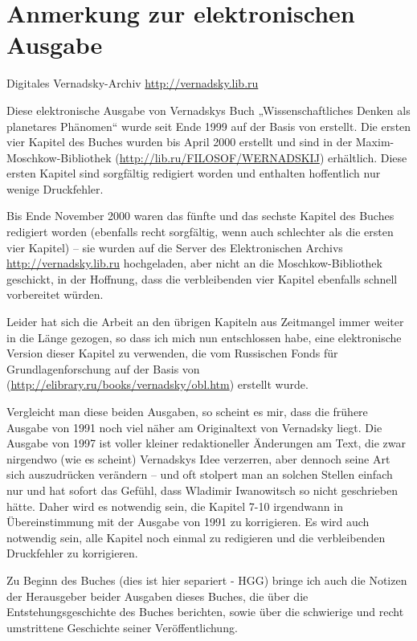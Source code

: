 \documentclass[11pt,a4paper]{article}
\begin{document}
\section{Anmerkung zur elektronischen Ausgabe}

Digitales Vernadsky-Archiv \url{http://vernadsky.lib.ru}

Diese elektronische Ausgabe von Vernadskys Buch „Wissenschaftliches Denken als
planetares Phänomen“ wurde seit Ende 1999 auf der Basis von
\cite{Vernadsky1991} erstellt.  Die ersten vier Kapitel des Buches wurden bis
April 2000 erstellt und sind in der Maxim-Moschkow-Bibliothek
(\url{http://lib.ru/FILOSOF/WERNADSKIJ}) erhältlich. Diese ersten Kapitel sind
sorgfältig redigiert worden und enthalten hoffentlich nur wenige Druckfehler.

Bis Ende November 2000 waren das fünfte und das sechste Kapitel des Buches
redigiert worden (ebenfalls recht sorgfältig, wenn auch schlechter als die
ersten vier Kapitel) -- sie wurden auf die Server des Elektronischen Archivs
\url{http://vernadsky.lib.ru} hochgeladen, aber nicht an die
Moschkow-Bibliothek geschickt, in der Hoffnung, dass die verbleibenden vier
Kapitel ebenfalls schnell vorbereitet würden.

Leider hat sich die Arbeit an den übrigen Kapiteln aus Zeitmangel immer weiter
in die Länge gezogen, so dass ich mich nun entschlossen habe, eine
elektronische Version dieser Kapitel zu verwenden, die vom Russischen Fonds
für Grundlagenforschung auf der Basis von  \cite{Vernadsky1997} 
(\url{http://elibrary.ru/books/vernadsky/obl.htm}) erstellt wurde. 

Vergleicht man diese beiden Ausgaben, so scheint es mir, dass die frühere
Ausgabe von 1991 noch viel näher am Originaltext von Vernadsky liegt. Die
Ausgabe von 1997 ist voller kleiner redaktioneller Änderungen am Text, die
zwar nirgendwo (wie es scheint) Vernadskys Idee verzerren, aber dennoch seine
Art sich auszudrücken verändern -- und oft stolpert man an solchen Stellen
einfach nur und hat sofort das Gefühl, dass Wladimir Iwanowitsch so nicht
geschrieben hätte. Daher wird es notwendig sein, die Kapitel 7-10 irgendwann
in Übereinstimmung mit der Ausgabe von 1991 zu korrigieren. Es wird auch
notwendig sein, alle Kapitel noch einmal zu redigieren und die verbleibenden
Druckfehler zu korrigieren.

Zu Beginn des Buches (dies ist hier separiert - HGG) bringe ich auch die
Notizen der Herausgeber beider Ausgaben dieses Buches, die über die
Entstehungsgeschichte des Buches berichten, sowie über die schwierige und
recht umstrittene Geschichte seiner Veröffentlichung.
\end{document}
